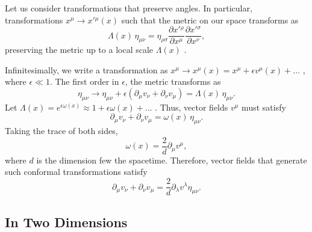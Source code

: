Let us consider transformations that preserve angles. In particular, transformations $x^{\mu} \to x'{}^{\mu}(x)$  such that the metric on our space transforms as 
\begin{equation}
  \Lambda(x) \, \eta_{\mu\nu} = \eta_{\rho\sigma} \frac{\partial x'{}^{\rho}}{\partial x^{\mu}} \frac{\partial x'{}^{\sigma}}{\partial x^{\nu}},
\end{equation}
preserving the metric up to a local scale $\Lambda(x)$ .

Infinitesimally, we write a transformation as $x^{\mu} \to x^{\mu}(x) = x^{\mu} + \epsilon v^{\mu}(x) + \dots$ , where $\epsilon \ll 1$.
The first order in $\epsilon$, the metric transforms as
 \begin{equation}
  \eta_{\mu\nu} \to \eta_{\mu\nu} + \epsilon(\partial_{\mu} v_{\nu} + \partial_{\nu} v_{\mu}) = \Lambda(x) \, \eta_{\mu\nu}.
\end{equation}
Let $\Lambda(x) = e^{\epsilon \omega(x)} \approx 1 + \epsilon \omega(x) + \dots$ .
Thus, vector fields $v^{\mu}$ must satisfy
\begin{equation}
  \partial_{\mu} v_{\nu} + \partial_{\nu} v_{\mu} = \omega(x)\, \eta_{\mu\nu}.
\end{equation}
Taking the trace of both sides,
\begin{equation}
  \omega(x) = \frac{2}{d} \partial_{\mu} v^{\mu},
\end{equation}
where $d$ is the dimension few the spacetime.
Therefore, vector fields that generate such conformal transformations satisfy
\begin{equation}
  \label{eq:10-star}
  \partial_{\mu} v_{\nu} + \partial_{\nu} v_{\mu} = \frac{2}{d} \partial_{\lambda} v^{\lambda} \eta_{\mu\nu}.
\end{equation}

\subsection{In Two Dimensions}%
\label{sub:in_two_dimensions}

